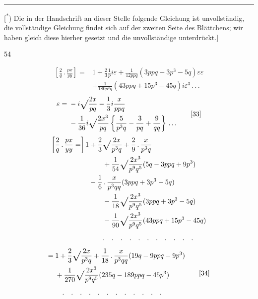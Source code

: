 \par\vfill\noindent\rule{.25\linewidth}{.4pt}\par\smallskip
{\footnotesize\noindent\hspace*{\parindent}[\textsuperscript{*}) Die in der Handschrift an dieser Stelle folgende Gleichung ist unvollständig, die vollständige Gleichung findet sich auf der zweiten Seite des Blättchens; wir haben gleich diese hierher gesetzt und die unvollständige unterdrückt.]\par}
\hfill{\small 54}\par
\clearpage{}
\begin{equation}\begin{aligned}
\left[\frac2q\,{.}\,\frac{px}{yy}\right]={}&1+\frac23\frac1p i\varepsilon+\frac1{12ppq}(3ppq+3p^3-5q)\varepsilon\varepsilon\\
 &+\frac1{180p^3q}(43ppq+15p^3-45q)i\varepsilon^3\,{.}\,{.}\,{.}
\end{aligned}\tag*{[32]}\end{equation}
\begin{equation}\begin{aligned}
\varepsilon={}&-i\vsroot{\frac{2x}{pq}}-\frac13 i\frac{x}{ppq}\\
 &-\frac1{36}i\vsroot{\frac{2x^3}{pq}}\left\{\frac5{p^3q}-\frac3{pq}+\frac9{qq}\right\}\,{.}\,{.}\,{.}
\end{aligned}\tag*{[33]}\end{equation}
\[\begin{aligned}
\left[\frac2q\,{.}\,\frac{px}{yy}=\right]1
 &+\frac23\vsroot{\frac{2x}{p^3q}}+\frac29\,{.}\,\frac{x}{p^3q}\\
 &\qquad+\frac1{54}\vsroot{\frac{2x^3}{p^9q^5}}(5q-3ppq+9p^3)\\
 &-\frac16\,{.}\,\frac{x}{p^3qq}(3ppq+3p^3-5q)\\
 &\qquad-\frac1{18}\vsroot{\frac{2x^3}{p^9q^5}}(3ppq+3p^3-5q)\\
 &\qquad-\frac1{90}\vsroot{\frac{2x^3}{p^9q^5}}(43ppq+15p^3-45q)\\
 &\qquad{.}\quad{.}\quad{.}\quad{.}\quad{.}\quad{.}\quad{.}\quad{.}\quad{.}\quad{.}\quad{.}
\end{aligned}\]
\begin{equation}\begin{aligned}
={}&1+\frac23\vsroot{\frac{2x}{p^3q}}+\frac1{18}\,{.}\,\frac{x}{p^3qq}(19q-9ppq-9p^3)\\
 &+\frac1{270}\vsroot{\frac{2x^3}{p^9q^5}}(235q-189ppq-45p^3)\\
 &\quad{.}\quad{.}\quad{.}\quad{.}\quad{.}\quad{.}\quad{.}\quad{.}\quad{.}\quad{.}\quad{.}\quad{.}
\end{aligned}\tag*{[34]}\end{equation}
